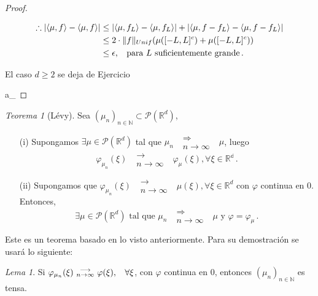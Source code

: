 \documentclass[letterpaper,11pt]{article} %
\def\espacio{\hspace{.25cm}\,}
\theoremstyle{defbreak}
\theoremstyle{propbreak}
\theoremstyle{remark}
\theoremstyle{break}
\newtheorem{theorem}{Teorema}[subsection]
\newtheorem{lemma}{Lema}[subsection]
\def\R{\mathbb{R}}
\def\conv{\mbox{ }\substack{\longrightarrow \\ n\to\infty}\mbox{ }}
\def\ejercicio{\color{blue}Ejercicio\color{black}}
\def\negro{\color{black}}
\def\findem{\null\hfill\color{white}a\color{black}_\square}
\begin{document}
\begin{proof}
\begin{itemize}
\begin{itemize}
        \begin{alignat*}{2}
        \therefore |\langle \mu,f\rangle-\langle\mu,f\rangle| & \leq |\langle \mu,f_L\rangle-\langle\mu,f_L\rangle| + |\langle \mu,f-f_L\rangle-\langle\mu,f-f_L\rangle| \\
         & \leq 2\cdot \|f\|_{Unif}(\mu([-L,L]^c)+\mu([-L,L]^c)) \\
         & \leq \epsilon , \espacio \mbox{para }L\mbox{ suficientemente grande} \, .
        \end{alignat*}
    \end{itemize}
    El caso $d\geq 2$ se deja de \ejercicio
\end{itemize}
\findem
\negro
\end{proof}

\vspace{3cm}
\begin{theorem}[Lévy]
\label{theorem:levy}
Sea $(\mu_n)_{n\in\mathbb{N}}\subset\mathcal{P}(\mathbb{R}^d)$,
\begin{enumerate}
    \item[(i)] Supongamos $\exists \mu\in\mathcal{P}(\R^d)$ tal que $\mu_n\mbox{ }\substack{\Longrightarrow \\ n\to\infty}\mbox{ }\mu$, luego 
    $$ \varphi_{\mu_n}(\xi)\mbox{ }\substack{\longrightarrow \\ n\to\infty}\mbox{ }\varphi_\mu(\xi), \forall\xi\in\mathbb{R^d} \, .$$
    \item[(ii)] Supongamos que $\varphi_{\mu_n}(\xi)\mbox{ }\substack{\longrightarrow \\ n\to\infty}\mbox{ }\mu(\xi), \forall\xi\in\mathbb{R}^d$ con $\varphi$ continua en $0$. Entonces, $$\exists\mu\in\mathcal{P}(\R^d)\mbox{ tal que }\mu_n\mbox{ }\substack{\Longrightarrow \\ n\to\infty}\mbox{ }\mu\mbox{ y }\varphi=\varphi_\mu \, .$$
\end{enumerate}
\end{theorem}
Este es un teorema basado en lo visto anteriormente. Para su demostración se usará lo siguiente:
\begin{lemma}
\label{lemma:levy}
Si $\varphi_{\mu_n}(\xi)\conv\varphi(\xi), \espacio \forall \xi$, con $\varphi$ continua en $0$, entonces $(\mu_n)_{n\in\mathbb{N}}$ es tensa.
\end{lemma}
\end{document}
